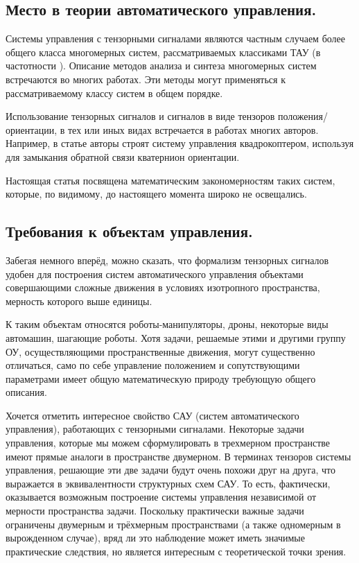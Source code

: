 \documentclass[a4paper]{article}
\begin{document}
\subsection{Место в теории автоматического управления.}
Системы управления с тензорными сигналами являются частным случаем более общего класса многомерных систем, рассматриваемых классиками ТАУ (в частотности \cite{tau}). Описание методов анализа и синтеза многомерных систем встречаются во многих работах. Эти методы могут применяться к рассматриваемому классу систем в общем порядке. 

Использование тензорных сигналов и сигналов в виде тензоров положения/ориентации, в тех или иных видах встречается в работах многих авторов. Например, в статье \cite{quadrotor} авторы строят систему управления квадрокоптером, используя для замыкания обратной связи кватернион ориентации. 

Настоящая статья посвящена математическим закономерностям таких систем, которые, по видимому, до настоящего момента широко не освещались.

\subsection{Требования к объектам управления.}
Забегая немного вперёд, можно сказать, что формализм тензорных сигналов удобен для построения систем автоматического управления объектами совершающими сложные движения в условиях изотропного пространства, мерность которого выше единицы.

К таким объектам относятся роботы-манипуляторы, дроны, некоторые виды автомашин, шагающие роботы. 
Хотя задачи, решаемые этими и другими группу ОУ, осуществляющими пространственные движения, могут существенно отличаться, само по себе управление положением и сопутствующими параметрами имеет общую математическую природу требующую общего описания.

Хочется отметить интересное свойство САУ (систем автоматического управления), работающих с тензорными сигналами. Некоторые задачи управления, которые мы можем сформулировать в трехмерном пространстве имеют прямые аналоги в пространстве двумерном. В терминах тензоров системы управления, решающие эти две задачи будут очень похожи друг на друга, что выражается в эквивалентности структурных схем САУ. То есть, фактически, оказывается возможным построение системы управления независимой от мерности пространства задачи. Поскольку практически важные задачи ограничены двумерным и трёхмерным пространствами (а также одномерным в вырожденном случае), вряд ли это наблюдение может иметь значимые практические следствия, но является интересным с теоретической точки зрения. 
\end{document}
